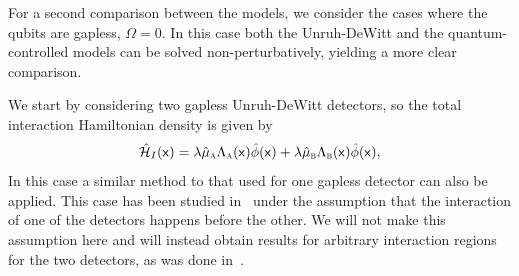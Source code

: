 \documentclass[letterpaper,12pt,titlepage,oneside,final]{book}
\newcommand{\mf}{\mathsf}%
\newcommand{\tc}[1]{\textsc{#1}}
\begin{document}
For a second comparison between the models, we consider the cases where the qubits are gapless, $\Omega = 0$. In this case both the Unruh-DeWitt and the quantum-controlled models can be solved non-perturbatively, yielding a more clear comparison. 

We start by considering two gapless Unruh-DeWitt detectors, so the total interaction Hamiltonian density is given by
\begin{equation}
    \hat{\mathcal{H}}_I(\mf x) = \lambda \hat{\mu}_\tc{a} \Lambda_\tc{a}(\mf x) \hat{\phi}(\mf x) + \lambda \hat{\mu}_\tc{b} \Lambda_\tc{b}(\mf x) \hat{\phi}(\mf x),
\end{equation}
In this case a similar method to that used for one gapless detector can also be applied. This case has been studied in~\cite{Landulfo} under the assumption that the interaction of one of the detectors happens before the other. We will not make this assumption here and will instead obtain results for arbitrary interaction regions for the two detectors, as was done in~\cite{analytical}.
\end{document}

